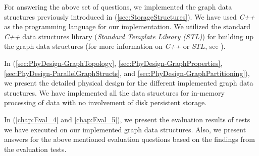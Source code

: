 {\begin{enumerate}
\end{enumerate}

For answering the above set of questions, we implemented the graph data structures previously introduced in (\ref{sec:StorageStructures}). We have used \textit{C++} as the programming language for our implementation. We utilized the standard \textit{C++} data structures library (\textit{Standard Template Library (STL)}) for building up the graph data structures (for more information on \textit{C++} or $STL$, see \cite{josuttis2012c++}). 

In (\ref{sec:PhyDesign-GraphTopology}, \ref{sec:PhyDesign-GraphProperties}, \ref{sec:PhyDesign-ParallelGraphStructs}, and \ref{sec:PhyDesign-GraphPartitioning}), we present the detailed physical design for the different implemented graph data structures. We have implemented all the data structures for in-memory processing of data with no involvement of disk persistent storage. 

In (\ref{chap:Eval_4} and \ref{chap:Eval_5}), we present the evaluation results of tests we have executed on our implemented graph data structures. Also, we present answers for the above mentioned evaluation questions based on the findings from the evaluation tests.


}
